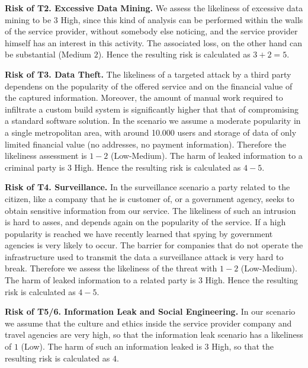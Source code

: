 \documentclass[runningheads,a4paper]{llncs}
\begin{document}
\textbf{Risk of T2. Excessive Data Mining.}
We assess the likeliness of excessive data mining to be $3$ High, since
this kind of analysis can be performed within the walls of the service
provider, without somebody else noticing, and the service provider himself
has an interest in this activity. The associated loss, on the other hand can be substantial (Medium $2$). Hence the resulting risk is calculated as $3+2 = 5$.

\textbf{Risk of T3. Data Theft.}
The likeliness of a targeted attack by a third party dependens on
the popularity of the offered service and on the financial value of the
captured information. Moreover, the amount of manual work required to
infiltrate a custom build system is significantly higher that that of
compromising a standard software solution. In the scenario we assume a
moderate popularity in a single metropolitan area, with around 10.000
users and storage of data of only limited financial value (no
addresses, no payment information). Therefore the likeliness
assessment is $1-2$ (Low-Medium). The harm of leaked information to a criminal party is $3$ High. Hence the resulting risk is calculated as $4-5$.

\textbf{Risk of T4. Surveillance.}  In the surveillance scenario a party
related to the citizen, like a company that he is customer of, or a
government agency, seeks to obtain sensitive information from our
service. The likeliness of such an intrusion is hard to asses, and depends
again on the popularity of the service. If a high popularity is
reached we have recently learned that spying by government agencies is
very likely to occur. The barrier for companies that do not operate
the infrastructure used to transmit the data a surveillance attack is very 
hard to break. Therefore we assess the likeliness of
the threat with $1-2$ (Low-Medium). The harm of leaked information to a related party is $3$ High. Hence the resulting risk is calculated as $4-5$.

\textbf{Risk of T5/6. Information Leak and Social Engineering.} In our scenario we assume that the culture and ethics inside the
service provider company and travel agencies are very high, so that
the information leak scenario has a likeliness of $1$ (Low). The harm of such an information leaked is $3$ High, so that the
resulting risk is calculated as $4$.
\end{document}
